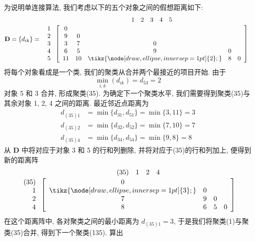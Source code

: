 为说明单连接算法, 我们考虑以下的五个对象之间的假想距离如下:
\[
\mathbf{D}=\{d_{ik}\}=
\begin{array}{r@{\;}c}
 & \begin{array}{ccccc}1&2&3&4&5\end{array}\\[2pt]
\begin{array}{r}1\\2\\3\\4\\5\end{array} &
\left[\begin{array}{ccccc}
0&&&&\\
9&0&&&\\
3&7&0&&\\
6&5&9&0&\\
11&10&\tikz{\node[draw,ellipse,inner sep=1pt]{2};}&8&0
\end{array}\right]
\end{array}
\]
将每个对象看成是一个类, 我们的聚类从合并两个最接近的项目开始. 由于
\[
\min_{i,k}(d_{ik})=d_{53}=2
\]
对象 5 和 3 合并, 形成聚类(35). 为确定下一个聚类水平, 我们需要得到聚类(35)与其余对象 1, 2, 4 之间的距离. 最近邻近点距离为
\[
\begin{aligned}
d_{(35)1}&=\min\{d_{31},d_{51}\}=\min\{3,11\}=3\\
d_{(35)2}&=\min\{d_{32},d_{52}\}=\min\{7,10\}=7\\
d_{(35)4}&=\min\{d_{34},d_{54}\}=\min\{9,8\}=8
\end{aligned}
\]
从 $\mathbf{D}$ 中将对应于对象 3 和 5 的行和列删除, 并将对应于(35)的行和列加上, 便得到新的距离阵
\[
\begin{array}{r@{\;}c}
 & \begin{array}{cccc}(35)&1&2&4\end{array}\\[2pt]
\begin{array}{r}(35)\\1\\2\\4\end{array} &
\left[\begin{array}{cccc}
0&&&\\
\tikz{\node[draw,ellipse,inner sep=1pt]{3};}&0&&\\
7&9&0&\\
8&6&5&0
\end{array}\right]
\end{array}
\]
在这个距离阵中, 各对聚类之间的最小距离为 $d_{(35)1}=3$, 于是我们将聚类(1)与聚类(35)合并, 得到下一个聚类(135). 算出
